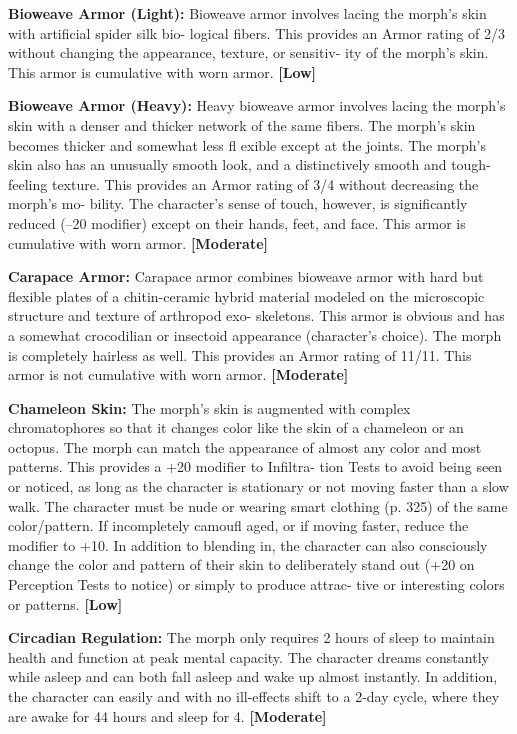 \textbf{Bioweave Armor (Light):} Bioweave armor involves 
lacing the morph's skin with artificial spider silk bio-
logical fibers. This provides an Armor rating of 2/3 
without changing the appearance, texture, or sensitiv-
ity of the morph's skin. This armor is cumulative with 
worn armor. \textbf{[Low]}

\textbf{Bioweave Armor (Heavy):} Heavy bioweave armor 
involves lacing the morph's skin with a denser and 
thicker network of the same fibers. The  morph's 
skin becomes thicker and somewhat less fl exible 
except at the joints. The morph's skin also has an 
unusually smooth look, and a distinctively smooth 
and tough-feeling texture. This provides an Armor 
rating of 3/4 without decreasing the morph's mo-
bility. The character's sense of touch, however, is 
significantly reduced (–20 modifier) except on their 
hands, feet, and face. This armor is cumulative with 
worn armor. \textbf{[Moderate]}

\textbf{Carapace Armor:} Carapace armor combines 
bioweave armor with hard but flexible plates of 
a chitin-ceramic hybrid material modeled on the 
microscopic structure and texture of arthropod exo-
skeletons. This armor is obvious and has a somewhat 
crocodilian or insectoid appearance (character's 
choice). The morph is completely hairless as well. This 
provides an Armor rating of 11/11. This armor is not 
cumulative with worn armor. \textbf{[Moderate]}

\textbf{Chameleon Skin: }The morph's skin is augmented 
with complex chromatophores so that it changes color 
like the skin of a chameleon or an octopus. The morph 
can match the appearance of almost any color and 
most patterns. This provides a +20 modifier to Infiltra-
tion Tests to avoid being seen or noticed, as long as 
the character is stationary or not moving faster than 
a slow walk. The character must be nude or wearing 
smart clothing (p. 325) of the same color/pattern. If 
incompletely camoufl aged, or if moving faster, reduce 
the modifier to +10. In addition to blending in, the 
character can also consciously change the color and 
pattern of their skin to deliberately stand out (+20 on 
Perception Tests to notice) or simply to produce attrac-
tive or interesting colors or patterns. \textbf{[Low]}

\textbf{Circadian Regulation:} The morph only requires 
2 hours of sleep to maintain health and function at 
peak mental capacity. The character dreams constantly 
while asleep and can both fall asleep and wake up 
almost instantly. In addition, the character can easily 
and with no ill-effects shift to a 2-day cycle, where they 
are awake for 44 hours and sleep for 4. \textbf{[Moderate]}

